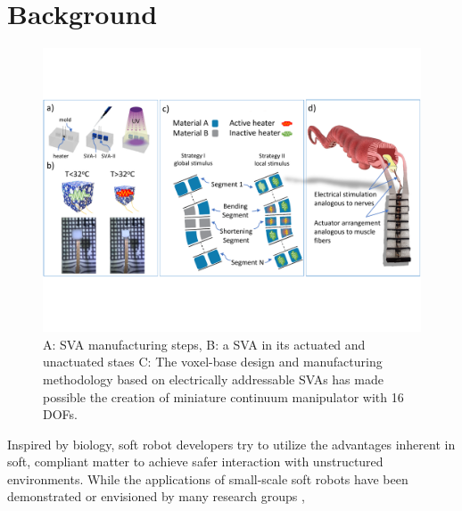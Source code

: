 \section{Background}
\begin{figure}[t]
      \centering
      \includegraphics[width=\textwidth]{concept4.pdf}
      \caption{A: SVA manufacturing steps, B: a SVA in its actuated and unactuated staes C: The voxel-base design and manufacturing methodology based on electrically addressable SVAs has made possible the creation of miniature continuum manipulator with 16 DOFs.}
      \label{fig:conceptSVA}
\end{figure}
Inspired by biology, soft robot developers try to utilize the advantages inherent in soft, compliant matter to achieve safer interaction with unstructured environments.  
While the applications of small-scale soft robots have been demonstrated or envisioned by many research groups \cite{hines2017soft}, %

